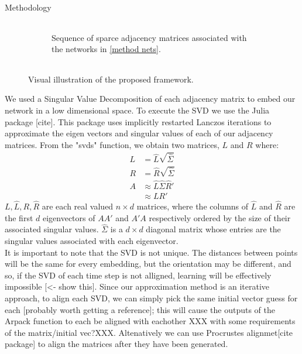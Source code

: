 \documentclass{article}
\begin{document}
\begin{section}{Methodology}
\begin{figure}
\begin{subfigure}[c]{1\textwidth}
\begin{tabular}{llll}
        \end{tabular}
        \caption{Sequence of sparce adjacency matrices associated with the networks in \autoref{method nets}.}
        \label{method adjacency}
    \end{subfigure}

        \begin{tabular}{llll}

        \end{tabular}

        \caption{Visual illustration of the proposed framework.}
        \label{framework illustration}
    \end{figure}
    
    We used a Singular Value Decomposition of each adjacency matrix to embed our network in a low dimensional space. To execute the SVD\cite{golub1971singular} we use the Julia package [cite]. This package uses implicitly restarted Lanczos iterations\cite{lehoucq1996deflation} to approximate the eigen vectors and singular values of each of our adjacency matrices. From the "svds" function, we obtain two matrices, $L$ and $R$ where:\\
    \begin{align}
        L&=\hat L \sqrt{\hat \Sigma }\\
        R &= \hat R \sqrt{\hat \Sigma }\\
        A &\approx \hat L \hat \Sigma \hat R'\\
        &\approx LR'
    \end{align}
    $L,\hat L, R, \hat R$ are each real valued $n\times d$ matrices, where the columns of $\hat L$ and $\hat R$ are the first $d$ eigenvectors of $AA'$ and $A'A$ respectively ordered by the size of their associated singular values. $\hat \Sigma$ is a $d\times d$ diagonal matrix whose entries are the singular values associated with each eigenvector. \\
    It is important to note that the SVD is not unique. The distances between points will be the same for every embedding, but the orientation may be different, and so, if the SVD of each time step is not alligned, learning will be effectively impossible [<- show this]. Since our approximation method is an iterative approach, to align each SVD, we can simply pick the same initial vector guess for each [probably worth getting a reference]; this will cause the outputs of the Arpack function to each be aligned with eachother XXX with some requirements of the matrix/initial vec?XXX. Altenatively we can use Procrustes alignmet[cite package] to align the matrices after they have been generated.\\

\end{section}
\end{document}
